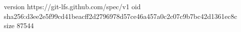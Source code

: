 version https://git-lfs.github.com/spec/v1
oid sha256:d3ee2e5f99cd41beacff2d2796978d57ce46a457a0c2c07c9b7bc42d1361ec8c
size 87544
